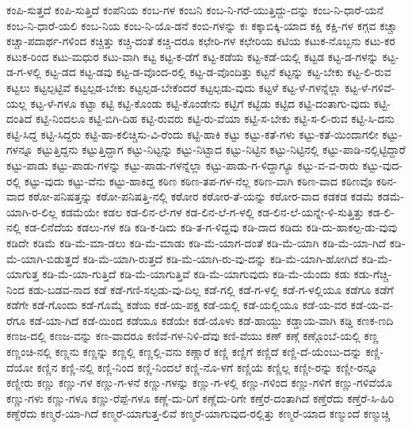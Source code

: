 ಕಂಪಿ-ಸುತ್ತದೆ
ಕಂಪಿ-ಸುತ್ತಿದೆ
ಕಂಪೆನಿಯ
ಕಂಬ-ಗಳ
ಕಂಬನಿ
ಕಂಬ-ನಿ-ಗರೆ-ಯುತ್ತಿದ್ದು-ದನ್ನು
ಕಂಬ-ನಿ-ಧಾರೆ-ಯನೆ
ಕಂಬ-ನಿ-ಧಾರೆ-ಯಲಿ
ಕಂಬ-ನಿಯ
ಕಂಬ-ನಿ-ಯೊ-ಡನೆ
ಕಂಬಿ-ಗಳನ್ನು
ಕಃ
ಕಕ್ಕಾಬಿಕ್ಕಿ-ಯಾದ
ಕಕ್ಷಿ
ಕಕ್ಷಿ-ಗಳ
ಕಗ್ಗವ
ಕಚ್ಚಾ
ಕಚ್ಚಾ-ಪದಾರ್ಥ-ಗಳಿಂದ
ಕಚ್ಚಿತ್ತು
ಕಚ್ಚಿ-ದಂತೆ
ಕಚ್ಚಿ-ದರೂ
ಕಛೇರಿ-ಗಳ
ಕಛೇರಿಯ
ಕಟಿಯ
ಕಟುಕ-ನೊಬ್ಬನು
ಕಟು-ಕರ
ಕಟುಕ-ರಿಂದ
ಕಟು-ಮಧುರ
ಕಟು-ವಾಗಿ
ಕಟ್ಟ
ಕಟ್ಟ-ಕ-ಡೆಗೆ
ಕಟ್ಟ-ಕಡೆಯ
ಕಟ್ಟ-ಕಡೆ-ಯಲ್ಲಿ
ಕಟ್ಟಡ
ಕಟ್ಟ-ಡ-ಗಳನ್ನು
ಕಟ್ಟ-ಡ-ಗ-ಳಲ್ಲಿ
ಕಟ್ಟ-ಡದ
ಕಟ್ಟ-ಡವು
ಕಟ್ಟ-ಡ-ವೊಂದ-ರಲ್ಲಿ
ಕಟ್ಟ-ಡ-ವೊಂದಿತ್ತು
ಕಟ್ಟನೆ
ಕಟ್ಟನ್ನು
ಕಟ್ಟ-ಬೇಕು
ಕಟ್ಟ-ಲಿ-ರುವ
ಕಟ್ಟಲು
ಕಟ್ಟಲ್ಪಟ್ಟಿವೆ
ಕಟ್ಟಲ್ಪಡ-ಬೇಕು
ಕಟ್ಟಲ್ಪಡ-ಬೇಕೆಂದರೆ
ಕಟ್ಟಲ್ಪಡು-ವುದು
ಕಟ್ಟಳೆ
ಕಟ್ಟ-ಳೆ-ಗಳನ್ನೆಲ್ಲಾ
ಕಟ್ಟ-ಳೆ-ಗಳಿವೆ-ಯಲ್ಲ
ಕಟ್ಟ-ಳೆ-ಗಳೂ
ಕಟ್ಟಾ
ಕಟ್ಟಿ
ಕಟ್ಟಿ-ಕೊಂಡು
ಕಟ್ಟಿ-ಕೊಂಡೇನು
ಕಟ್ಟಿಗೆ
ಕಟ್ಟಿಡು
ಕಟ್ಟಿದ
ಕಟ್ಟಿ-ದಂತಾಗು-ವುದು
ಕಟ್ಟಿ-ದಂತಿದೆ
ಕಟ್ಟಿ-ನಿಂದಲೂ
ಕಟ್ಟಿ-ಬಿಗಿ-ದಿಹ
ಕಟ್ಟಿ-ರುವರು
ಕಟ್ಟಿ-ರು-ವೆಯಾ
ಕಟ್ಟಿ-ಸ-ಬೇಕು
ಕಟ್ಟಿ-ಸ-ಲಿ-ರುವ
ಕಟ್ಟಿ-ಸಿ-ದನು
ಕಟ್ಟಿ-ಸಿದ್ದ
ಕಟ್ಟಿ-ಸಿದ್ದರು
ಕಟ್ಟಿ-ಹಾ-ಕಲಿಚ್ಚಿಸು-ವಿ-ರೆಂದು
ಕಟ್ಟಿ-ಹಾಕಿ
ಕಟ್ಟು
ಕಟ್ಟು-ಕತೆ-ಗಳು
ಕಟ್ಟು-ಕತೆ-ಯಿಂದಾಗಲೀ
ಕಟ್ಟು-ಗಳನ್ನೂ
ಕಟ್ಟುತ್ತಿದ್ದನು
ಕಟ್ಟುತ್ತಿದ್ದಾಗ
ಕಟ್ಟು-ನಿಟ್ಟನ್ನು
ಕಟ್ಟು-ನಿಟ್ಟಾದ
ಕಟ್ಟು-ನಿಟ್ಟಿನ
ಕಟ್ಟು-ನಿಟ್ಟಿನಲ್ಲಿ
ಕಟ್ಟು-ಪಾಡಿ-ನಲ್ಲಿಟ್ಟಿದ್ದಾರೆ
ಕಟ್ಟು-ಪಾಡು
ಕಟ್ಟು-ಪಾಡು-ಗಳನ್ನು
ಕಟ್ಟು-ಪಾಡು-ಗಳನ್ನೆಲ್ಲಾ
ಕಟ್ಟು-ಪಾಡು-ಗ-ಳಿದ್ದಾಗ್ಯೂ
ಕಟ್ಟು-ವ-ವ-ರಾರು
ಕಟ್ಟು-ವುದ-ರಲ್ಲಿ
ಕಟ್ಟು-ವುದು
ಕಟ್ಟು-ವೆನು
ಕಟ್ಟು-ಹಾಕಿದ್ದ
ಕಠಿಣ
ಕಠಿಣ-ತಪ-ಗಳ-ನೆಲ್ಲ
ಕಠಿಣ-ವಾಗಿ
ಕಠಿಣ-ವಾದ
ಕಠಿಣವೊ
ಕಠಿನ-ವಾದ
ಕಠೋ-ಪನಿಷತ್ತನ್ನು
ಕಠೋ-ಪನಿಷತ್ತಿ-ನಲ್ಲಿ
ಕಠೋರ
ಕಠೋರ-ತೆ-ಯನ್ನು
ಕಠೋರ-ವಾದ
ಕಡಕಡ
ಕಡಮೆ
ಕಡಮೆ-ಯಾಗಿ-ರ-ಲಿಲ್ಲ
ಕಡಮೆಯೇ
ಕಡಲ
ಕಡ-ಲಿನ-ಲೆ-ಗಳ
ಕಡ-ಲಿನ-ಲೆ-ಗ-ಳಲ್ಲಿ
ಕಡ-ಲಿನ-ಲೆ-ಯನ್ನೇ-ಳಿ-ಸುತ್ತಿತ್ತು
ಕಡ-ಲಿ-ನಲ್ಲಿ
ಕಡ-ಲಿನೆದೆಯ
ಕಡಲು-ಗಳ
ಕಡಿ
ಕಡಿ-ಕ-ಡಿದು
ಕಡಿ-ತ-ಗ-ಳಿದ್ದವು
ಕಡಿ-ದಾದ
ಕಡಿದು
ಕಡಿ-ದು-ಹಾಕಲ್ಪ-ಡು-ವುವು
ಕಡಿದೇ
ಕಡಿಮೆ
ಕಡಿ-ಮೆ-ಮಾ-ಡಲು
ಕಡಿ-ಮೆ-ಮಾಡು
ಕಡಿ-ಮೆ-ಯಾಗ-ದಂತೆ
ಕಡಿ-ಮೆ-ಯಾಗಿ
ಕಡಿ-ಮೆ-ಯಾ-ಗಿದೆ
ಕಡಿ-ಮೆ-ಯಾಗಿ-ಬಿಡುತ್ತದೆ
ಕಡಿ-ಮೆ-ಯಾಗಿ-ರುತ್ತದೆ
ಕಡಿ-ಮೆ-ಯಾಗಿ-ರು-ವು-ದನ್ನು
ಕಡಿ-ಮೆ-ಯಾಗಿ-ಹೋಗಿದೆ
ಕಡಿ-ಮೆ-ಯಾಗುತ್ತ
ಕಡಿ-ಮೆ-ಯಾ-ಗುತ್ತಿದೆ
ಕಡಿ-ಮೆ-ಯಾಗುತ್ತಿವೆ
ಕಡಿ-ಮೆ-ಯಾಗುವುದು
ಕಡಿ-ಮೆ-ಯೆಂದು
ಕಡು
ಕಡು-ಗೆಚ್ಚಿ-ನಿಂದ
ಕಡು-ಬಡವ-ನಾದ
ಕಡೆ
ಕಡೆ-ಗಣಿ-ಸಲ್ಪಡು-ವು-ದಿಲ್ಲ
ಕಡೆ-ಗಲ್ಲಿ
ಕಡೆ-ಗ-ಳಲ್ಲಿ
ಕಡೆ-ಗ-ಳಲ್ಲಿಯೂ
ಕಡೆಗೂ
ಕಡೆಗೆ
ಕಡೆಗೇ
ಕಡೆ-ಗೊಂದು
ಕಡೆ-ಗೊಮ್ಮೆ
ಕಡೆಯ
ಕಡೆ-ಯ-ಪಕ್ಷ
ಕಡೆ-ಯಲ್ಲಿ
ಕಡೆ-ಯಲ್ಲಿಯೂ
ಕಡೆ-ಯ-ವರ
ಕಡೆ-ಯ-ವ-ರೆಗೂ
ಕಡೆ-ಯಾ-ಗಿದೆ
ಕಡೆ-ಯಿಂದ
ಕಡೆಯೂ
ಕಡೆಯೇ
ಕಡೆ-ಯೊಳು
ಕಡೆ-ಹಾಯ್ದು
ಕಡ್ಡಾಯ-ವಾಗಿ
ಕಡ್ಡಿ
ಕಣಕ-ಣದಿ
ಕಣಜ-ದಲ್ಲಿ
ಕಣಜ-ವನ್ನು
ಕಣ-ವಾದರೂ
ಕಣಿವೆ-ಗಳ-ನಿಳಿ-ದೆವು
ಕಣಿ-ವೆಯು
ಕಣ್
ಕಣ್ಗೆ
ಕಣ್ಗೊಂಬೆ-ಯಲ್ಲಿ
ಕಣ್ಣ
ಕಣ್ಣಂಚಿ-ನಲ್ಲಿ
ಕಣ್ಣನು
ಕಣ್ಣನ್ನು
ಕಣ್ಣಲ್ಲಿ
ಕಣ್ಣಲ್ಲಿ-ವನು
ಕಣ್ಣಾರೆ
ಕಣ್ಣಿ
ಕಣ್ಣಿಗೆ
ಕಣ್ಣಿದೆ
ಕಣ್ಣಿ-ದೆ-ಯೆಂಬು-ದನ್ನು
ಕಣ್ಣಿ-ದೆಯೋ
ಕಣ್ಣಿನ
ಕಣ್ಣಿ-ನಲ್ಲಿ
ಕಣ್ಣಿ-ನಿಂದ
ಕಣ್ಣಿ-ನಿಂದಲೆ
ಕಣ್ಣಿ-ನೊ-ಳಗೆ
ಕಣ್ಣಿಯೆ
ಕಣ್ಣಿಲ್ಲ
ಕಣ್ಣೀ-ರನ್ನು
ಕಣ್ಣೀ-ರನ್ನೂ
ಕಣ್ಣೀರು
ಕಣ್ಣು
ಕಣ್ಣು-ಗಳ
ಕಣ್ಣು-ಗ-ಳನೆ
ಕಣ್ಣು-ಗಳನ್ನು
ಕಣ್ಣು-ಗ-ಳಲ್ಲಿ
ಕಣ್ಣು-ಗಳಿಂದ
ಕಣ್ಣು-ಗಳಿಗೆ
ಕಣ್ಣು-ಗಳಿವೆಯೊ
ಕಣ್ಣು-ಗಳು
ಕಣ್ಣು-ಗಳೂ
ಕಣ್ಣು-ರೆಪ್ಪೆ-ಗಳೂ
ಕಣ್ಣೆ-ದು-ರಿಗೆ
ಕಣ್ಣೆದು-ರಿಗೇ
ಕಣ್ತೆರೆ-ದಂತಾಗಿದೆ
ಕಣ್ತೆರೆದು
ಕಣ್ತೆರೆ-ಸಿ-ಹಿರಿ
ಕಣ್ದೆರೆದು
ಕಣ್ಮರೆ-ಯಾ-ಗಿದೆ
ಕಣ್ಮರೆ-ಯಾಗುತ್ತ-ಲಿವೆ
ಕಣ್ಮರೆ-ಯಾಗುವುದ-ರಲ್ಲಿತ್ತು
ಕಣ್ಮರೆ-ಯಾದ
ಕಣ್ಮುಂದೆ
ಕಣ್ಮುಚ್ಚಿ
